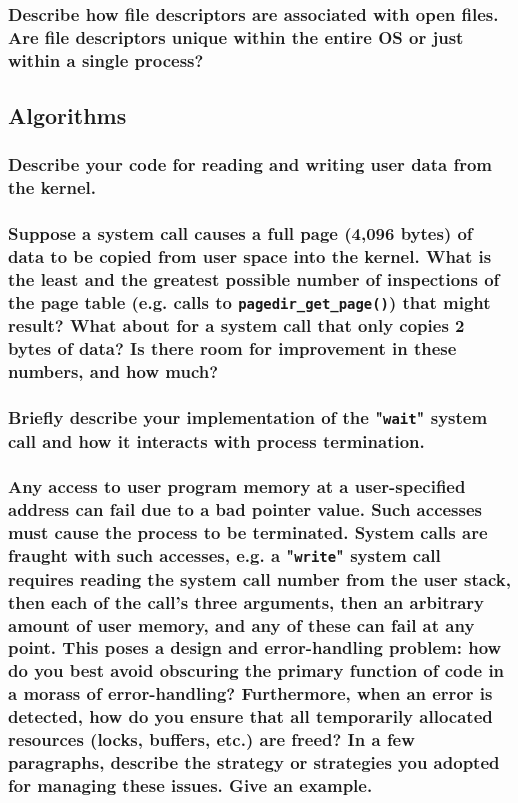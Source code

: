 \documentclass[sigconf, nonacm, balance=false, urlbreakonhyphens=true]{acmart}
\begin{document}
            \subsubsection{Describe how file descriptors are associated with open files.  Are file descriptors unique within the entire OS or just within a single process? }

        \subsection{Algorithms}

            \subsubsection{Describe your code for reading and writing user data from the kernel. } 

            \subsubsection{Suppose a system call causes a full page (4,096 bytes) of data to be copied from user space into the kernel.  What is the least and the greatest possible number of inspections of the page table (e.g. calls to \texttt{pagedir\_get\_page()}) that might result?  What about for a system call that only copies 2 bytes of data?  Is there room for improvement in these numbers, and how much? }

            \subsubsection{Briefly describe your implementation of the "\texttt{wait}" system call and how it interacts with process termination. }

            \subsubsection{Any access to user program memory at a user-specified address can fail due to a bad pointer value.  Such accesses must cause the process to be terminated.  System calls are fraught with such accesses, e.g. a "\texttt{write}" system call requires reading the system call number from the user stack, then each of the call's three arguments, then an arbitrary amount of user memory, and any of these can fail at any point.  This poses a design and error-handling problem: how do you best avoid obscuring the primary function of code in a morass of error-handling?  Furthermore, when an error is detected, how do you ensure that all temporarily allocated resources (locks, buffers, etc.) are freed?  In a few paragraphs, describe the strategy or strategies you adopted for managing these issues.  Give an example. }
\end{document}
